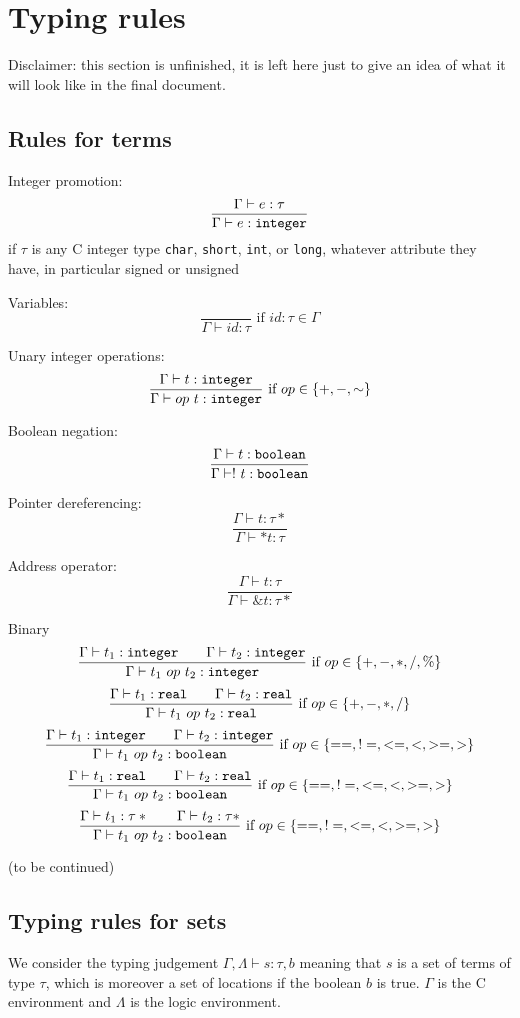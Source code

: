 \section{Typing rules}
\label{sec:typingrules}

Disclaimer: this section is unfinished, it is left here just to give an idea of what it will look like in the final document.

\subsection{Rules for terms}

Integer promotion:
\[
\frac{\Gamma \vdash e : \tau}{\Gamma \vdash e : \texttt{integer}}
\]
if $\tau$ is any C integer type \verb|char|, \verb|short|, \verb|int|, or \verb|long|, whatever attribute they have, in particular signed or unsigned

Variables:
\[
\frac{}{\Gamma \vdash id : \tau} \mbox{ if $id:\tau\in\Gamma$}
\]

Unary integer operations:
\[
\frac{\Gamma \vdash t : \texttt{integer}}{\Gamma \vdash op~t : \texttt{integer}} \mbox{ if $op\in \{+,-,\sim\}$}
\]

Boolean negation:
\[
\frac{\Gamma \vdash t : \texttt{boolean}}{\Gamma \vdash !~t : \texttt{boolean}}
\]

Pointer dereferencing:
\[
\frac{\Gamma \vdash t : \tau*}{\Gamma \vdash *t : \tau}
\]

Address operator:
\[
\frac{\Gamma \vdash t : \tau}{\Gamma \vdash \&t : \tau*}
\]

Binary
\[
\frac{\Gamma \vdash t_1 : \texttt{integer}\qquad\Gamma \vdash t_2 : \texttt{integer}}{\Gamma \vdash t_1~op~t_2 : \texttt{integer}} \mbox{ if $op\in \{+,-,*,/,\%\}$}
\]
\[
\frac{\Gamma \vdash t_1 : \texttt{real}\qquad\Gamma \vdash t_2 : \texttt{real}}{\Gamma \vdash t_1~op~t_2 : \texttt{real}} \mbox{ if $op\in \{+,-,*,/\}$}
\]
\[
\frac{\Gamma \vdash t_1 : \texttt{integer}\qquad\Gamma \vdash t_2 : \texttt{integer}}{\Gamma \vdash t_1~op~t_2 : \texttt{boolean}} \mbox{ if $op\in \{==,!=,<=,<,>=,>\}$}
\]
\[
\frac{\Gamma \vdash t_1 : \texttt{real}\qquad\Gamma \vdash t_2 : \texttt{real}}{\Gamma \vdash t_1~op~t_2 : \texttt{boolean}} \mbox{ if $op\in \{==,!=,<=,<,>=,>\}$}
\]
\[
\frac{\Gamma \vdash t_1 : \tau*\qquad\Gamma \vdash t_2 : \tau*}{\Gamma \vdash t_1~op~t_2 : \texttt{boolean}} \mbox{ if $op\in \{==,!=,<=,<,>=,>\}$}
\]

(to be continued)


\subsection{Typing rules for sets}
We consider the typing judgement $\Gamma,\Lambda \vdash s : \tau,b$
meaning that $s$ is a set of terms of type $\tau$, which is moreover a
set of locations if the boolean $b$ is true.
$\Gamma$ is the C environment and $\Lambda$ is the logic environment.

